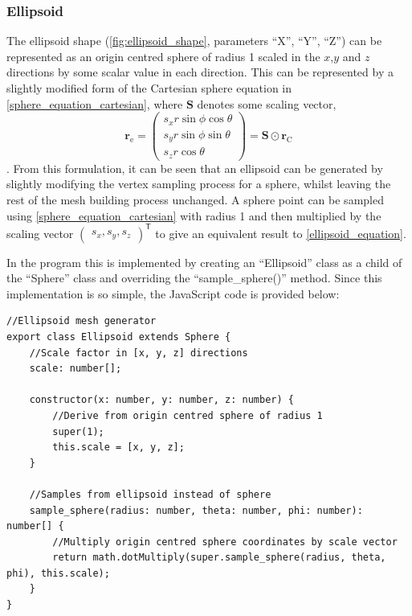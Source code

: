 
\subsubsection{Ellipsoid}
The ellipsoid shape (\cref{fig:ellipsoid_shape}, parameters ``X'', ``Y'', ``Z'') can be represented as an origin centred sphere of radius 1 scaled in the $x$,$y$ and $z$ directions by some scalar value in each direction. This can be represented by a slightly modified form of the Cartesian sphere equation in \cref{sphere_equation_cartesian}, where $\mathbf{S}$ denotes some scaling vector,
\begin{equation}
\mathbf{r}_\mathrm{e}=\begin{pmatrix}s_x r\sin\phi \cos\theta\\
s_y r\sin\phi \sin\theta\\
s_z r\cos\theta\end{pmatrix}
=\mathbf{S} \odot \mathbf{r}_\mathrm{C}
\label{ellipsoid_equation}
\end{equation}.
From this formulation, it can be seen that an ellipsoid can be generated by slightly modifying the vertex sampling process for a sphere, whilst leaving the rest of the mesh building process unchanged. A sphere point can be sampled using \cref{sphere_equation_cartesian} with radius 1 and then multiplied by the scaling vector $\begin{pmatrix}s_x,s_y,s_z\end{pmatrix}^\mathsf{T}$ to give an equivalent result to \cref{ellipsoid_equation}.

In the program this is implemented by creating an ``Ellipsoid'' class as a child of the ``Sphere'' class and overriding the ``sample\_sphere()'' method. Since this implementation is so simple, the JavaScript code is provided below:

\begin{adjustbox}{width=\textwidth}
\begin{lstlisting}
//Ellipsoid mesh generator
export class Ellipsoid extends Sphere {
    //Scale factor in [x, y, z] directions
    scale: number[];

    constructor(x: number, y: number, z: number) {
        //Derive from origin centred sphere of radius 1
        super(1);
        this.scale = [x, y, z];
    }

    //Samples from ellipsoid instead of sphere
    sample_sphere(radius: number, theta: number, phi: number): number[] {
        //Multiply origin centred sphere coordinates by scale vector
        return math.dotMultiply(super.sample_sphere(radius, theta, phi), this.scale);
    }
}
\end{lstlisting}
\end{adjustbox}

